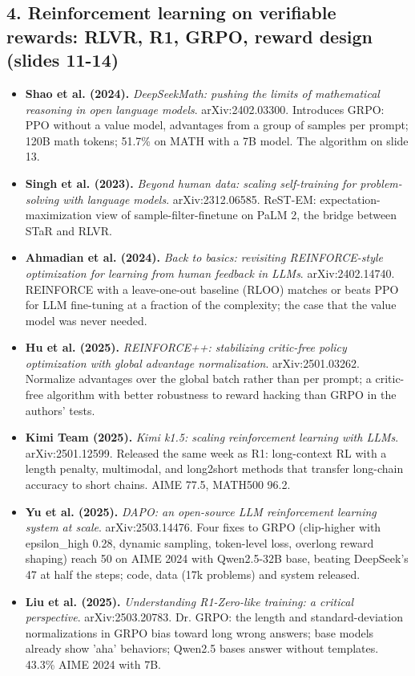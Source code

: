 \subsection*{4. Reinforcement learning on verifiable rewards: RLVR, R1, GRPO, reward design (slides 11-14)}
\begin{itemize}[leftmargin=1.2em,itemsep=3pt]\sloppy
\item \textbf{Shao et al. (2024).} \textit{DeepSeekMath: pushing the limits of mathematical reasoning in open language models}. arXiv:2402.03300. Introduces GRPO: PPO without a value model, advantages from a group of samples per prompt; 120B math tokens; 51.7\% on MATH with a 7B model. The algorithm on slide 13.
\item \textbf{Singh et al. (2023).} \textit{Beyond human data: scaling self-training for problem-solving with language models}. arXiv:2312.06585. ReST-EM: expectation-maximization view of sample-filter-finetune on PaLM 2, the bridge between STaR and RLVR.
\item \textbf{Ahmadian et al. (2024).} \textit{Back to basics: revisiting REINFORCE-style optimization for learning from human feedback in LLMs}. arXiv:2402.14740. REINFORCE with a leave-one-out baseline (RLOO) matches or beats PPO for LLM fine-tuning at a fraction of the complexity; the case that the value model was never needed.
\item \textbf{Hu et al. (2025).} \textit{REINFORCE++: stabilizing critic-free policy optimization with global advantage normalization}. arXiv:2501.03262. Normalize advantages over the global batch rather than per prompt; a critic-free algorithm with better robustness to reward hacking than GRPO in the authors' tests.
\item \textbf{Kimi Team (2025).} \textit{Kimi k1.5: scaling reinforcement learning with LLMs}. arXiv:2501.12599. Released the same week as R1: long-context RL with a length penalty, multimodal, and long2short methods that transfer long-chain accuracy to short chains. AIME 77.5, MATH500 96.2.
\item \textbf{Yu et al. (2025).} \textit{DAPO: an open-source LLM reinforcement learning system at scale}. arXiv:2503.14476. Four fixes to GRPO (clip-higher with epsilon\_high 0.28, dynamic sampling, token-level loss, overlong reward shaping) reach 50 on AIME 2024 with Qwen2.5-32B base, beating DeepSeek's 47 at half the steps; code, data (17k problems) and system released.
\item \textbf{Liu et al. (2025).} \textit{Understanding R1-Zero-like training: a critical perspective}. arXiv:2503.20783. Dr. GRPO: the length and standard-deviation normalizations in GRPO bias toward long wrong answers; base models already show 'aha' behaviors; Qwen2.5 bases answer without templates. 43.3\% AIME 2024 with 7B.

\end{itemize}
